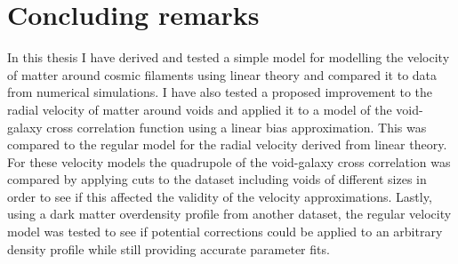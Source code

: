 \chapter{Concluding remarks}\label{sec:conclusion}
In this thesis I have derived and tested a simple model for modelling the velocity of matter around cosmic filaments using linear theory and compared it to data from numerical simulations. I have also tested a proposed improvement to the radial velocity of matter around voids and applied it to a model of the void-galaxy cross correlation function using a linear bias approximation. This was compared to the regular model for the radial velocity derived from linear theory. For these velocity models the quadrupole of the void-galaxy cross correlation was compared by applying cuts to the dataset including voids of different sizes in order to see if this affected the validity of the velocity approximations. Lastly, using a dark matter overdensity profile from another dataset, the regular velocity model was tested to see if potential corrections could be applied to an arbitrary density profile while still providing accurate parameter fits.
